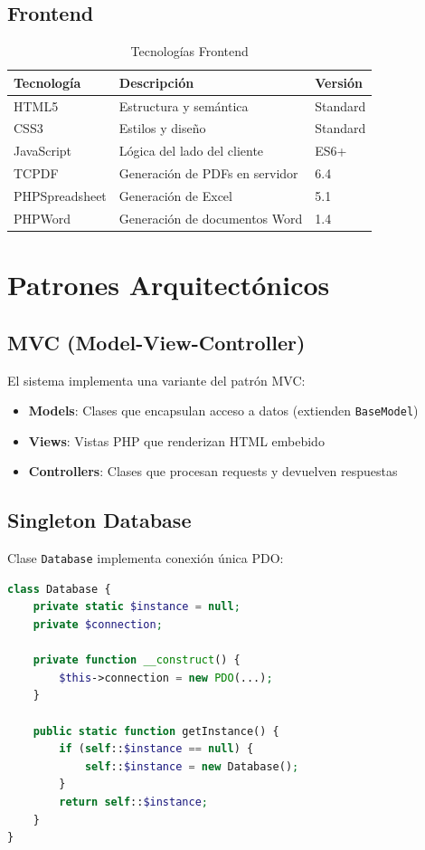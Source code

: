 \documentclass[12pt, a4paper]{report}
\begin{document}
\subsection{Frontend}
\begin{table}[H]
\centering
\begin{tabularx}{\textwidth}{|l|X|l|}
\hline
\textbf{Tecnología} & \textbf{Descripción} & \textbf{Versión} \\
\hline
HTML5 & Estructura y semántica & Standard \\
CSS3 & Estilos y diseño & Standard \\
JavaScript & Lógica del lado del cliente & ES6+ \\
TCPDF & Generación de PDFs en servidor & 6.4 \\
PHPSpreadsheet & Generación de Excel & 5.1 \\
PHPWord & Generación de documentos Word & 1.4 \\
\hline
\end{tabularx}
\caption{Tecnologías Frontend}
\end{table}

\section{Patrones Arquitectónicos}

\subsection{MVC (Model-View-Controller)}
El sistema implementa una variante del patrón MVC:
\begin{itemize}
    \item \textbf{Models}: Clases que encapsulan acceso a datos (extienden \texttt{BaseModel})
    \item \textbf{Views}: Vistas PHP que renderizan HTML embebido
    \item \textbf{Controllers}: Clases que procesan requests y devuelven respuestas
\end{itemize}

\subsection{Singleton Database}
Clase \texttt{Database} implementa conexión única PDO:
\begin{lstlisting}[language=PHP, caption=Patrón Singleton Database]
class Database {
    private static $instance = null;
    private $connection;
    
    private function __construct() {
        $this->connection = new PDO(...);
    }
    
    public static function getInstance() {
        if (self::$instance == null) {
            self::$instance = new Database();
        }
        return self::$instance;
    }
}
\end{lstlisting}
\end{document}
